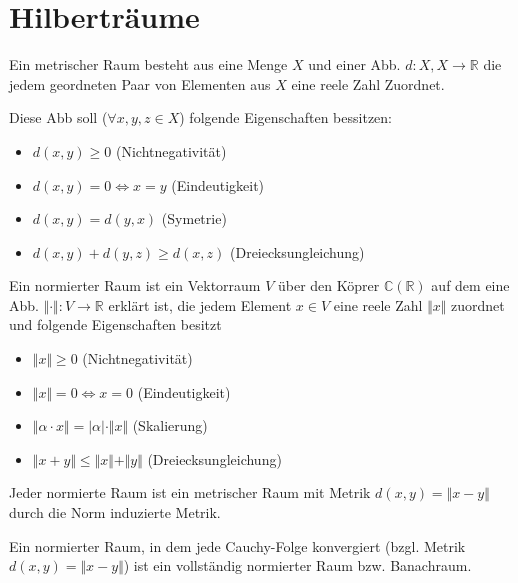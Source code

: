\section{Hilberträume}
    \begin{Def}
		Ein metrischer Raum besteht aus eine Menge $X$ und einer Abb. $d: X,X\rightarrow \mathbb{R}$
		die jedem geordneten Paar von Elementen aus $X$ eine reele Zahl Zuordnet.

		Diese Abb soll ($\forall x,y,z \in X$) folgende Eigenschaften bessitzen:

		\begin{itemize}
			\item $d(x,y) \geq 0$ (Nichtnegativität)
			\item $d(x,y) = 0 \Leftrightarrow x = y$ (Eindeutigkeit)
			\item $d(x,y) = d(y,x)$ (Symetrie)
			\item $d(x,y) + d(y,z) \geq d(x,z)$ (Dreiecksungleichung)
		\end{itemize}
	\end{Def}
	
	\begin{Def}
		Ein normierter Raum ist ein Vektorraum $V$ über den Köprer $\mathbb{C} (\mathbb{R})$
		auf dem eine Abb. $\Vert\cdot\Vert: V \rightarrow \mathbb{R}$ erklärt ist, die jedem
		Element $x \in V$ eine reele Zahl $\Vert x \Vert$ zuordnet und folgende Eigenschaften
		besitzt
		\begin{itemize}
			\item $\Vert x \Vert \geq 0$ (Nichtnegativität)
			\item $\Vert x \Vert = 0 \Leftrightarrow x = 0$ (Eindeutigkeit)
			\item $\Vert \alpha \cdot x \Vert = \vert \alpha \vert \cdot \Vert x \Vert$ (Skalierung)
			\item $\Vert x + y\Vert \leq \Vert x \Vert + \Vert y \Vert$ (Dreiecksungleichung)
		\end{itemize}
	\end{Def}

	\begin{Bem}
		Jeder normierte Raum ist ein metrischer Raum mit Metrik $d(x,y) = \Vert x-y \Vert$
		durch die Norm induzierte Metrik. 
	\end{Bem}

	\begin{Def}
		Ein normierter Raum, in dem jede Cauchy-Folge konvergiert (bzgl. Metrik $d(x,y) = \Vert x-y \Vert$)
		ist ein vollständig normierter Raum bzw. Banachraum.
	\end{Def}

